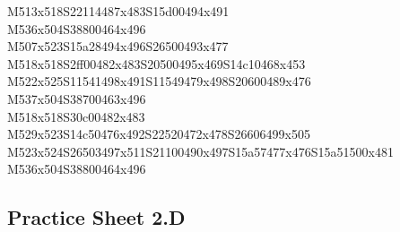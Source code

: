 \documentclass{article}
\begin{document}
\begin{multicols}{5}
\begin{center}
M513x518S22114487x483S15d00494x491 %
\\M536x504S38800464x496 %
\\M507x523S15a28494x496S26500493x477 %
\\M518x518S2ff00482x483S20500495x469S14c10468x453 %
\\M522x525S11541498x491S11549479x498S20600489x476 %
\\M537x504S38700463x496 %
\\M518x518S30c00482x483 %
\\M529x523S14c50476x492S22520472x478S26606499x505 %
\\M523x524S26503497x511S21100490x497S15a57477x476S15a51500x481
\\M536x504S38800464x496 %
\vfil

\end{center}
\end{multicols}

\subsection{Practice Sheet 2.D}
\end{document}
